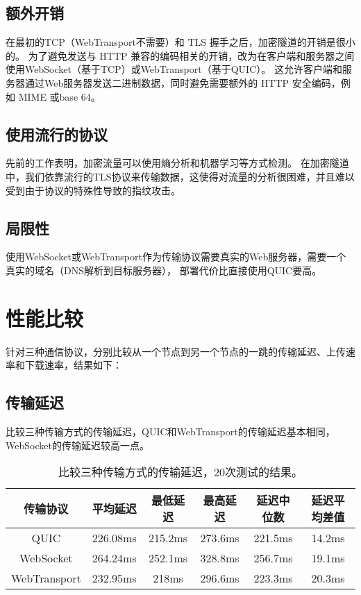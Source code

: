 \subsection{额外开销}
在最初的TCP（WebTransport不需要）和 TLS 握手之后，加密隧道的开销是很小的。
为了避免发送与 HTTP 兼容的编码相关的开销，改为在客户端和服务器之间使用WebSocket（基于TCP）或WebTransport（基于QUIC）。
这允许客户端和服务器通过Web服务器发送二进制数据，同时避免需要额外的 HTTP 安全编码，例如 MIME 或base 64。

\subsection{使用流行的协议}
先前的工作表明，加密流量可以使用熵分析和机器学习等方式检测。
在加密隧道中，我们依靠流行的TLS协议来传输数据，这使得对流量的分析很困难，并且难以受到由于协议的特殊性导致的指纹攻击。

\subsection{局限性}
使用WebSocket或WebTransport作为传输协议需要真实的Web服务器，需要一个真实的域名（DNS解析到目标服务器），
部署代价比直接使用QUIC要高。


\section{性能比较}
针对三种通信协议，分别比较从一个节点到另一个节点的一跳的传输延迟、上传速率和下载速率，结果如下：

\subsection{传输延迟}
比较三种传输方式的传输延迟，QUIC和WebTransport的传输延迟基本相同，WebSocket的传输延迟较高一点。

\begin{table}[H]
  \begin{tabular}{|c|c|c|c|c|c|}
  \hline
  传输协议 & 平均延迟 & 最低延迟 & 最高延迟 & 延迟中位数 & 延迟平均差值  \\ \hline        
  QUIC & 226.08ms & 215.2ms & 273.6ms & 221.5ms & 14.2ms \\ \hline    
  WebSocket & 264.24ms & 252.1ms & 328.8ms & 256.7ms & 19.1ms \\ \hline          
  WebTransport & 232.95ms & 218ms & 296.6ms & 223.3ms & 20.3ms \\ \hline         
  \end{tabular}
  \caption{比较三种传输方式的传输延迟，20次测试的结果。}
\end{table}

